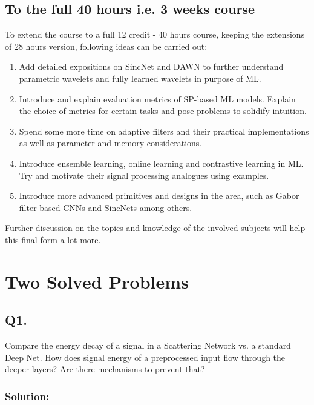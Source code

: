 \documentclass[12pt]{article}
\begin{document}
\subsection{To the full 40 hours i.e. 3 weeks course}
To extend the course to a full 12 credit - 40 hours course, keeping the extensions of 28 hours version, following ideas can be carried out:
\begin{enumerate}
    \item Add detailed expositions on SincNet and DAWN to further understand parametric wavelets and fully learned wavelets in purpose of ML.
    \item Introduce and explain evaluation metrics of SP-based ML models. Explain the choice of metrics for certain tasks and pose problems to solidify intuition.
    \item Spend some more time on adaptive filters and their practical implementations as well as parameter and memory considerations.
    \item Introduce ensemble learning, online learning and contrastive learning in ML. Try and motivate their signal processing analogues using examples. 
    \item Introduce more advanced primitives and designs in the area, such as Gabor filter based CNNs and SincNets among others.
\end{enumerate}
Further discussion on the topics and knowledge of the involved subjects will help this final form a lot more. 

\newpage
\section{Two Solved Problems}
\subsection{Q1.}
Compare the energy decay of a signal in a Scattering Network vs. a standard Deep Net. How does signal energy of a preprocessed input flow through the deeper layers? Are there mechanisms to prevent that?

\subsubsection*{Solution:}

\end{document}
